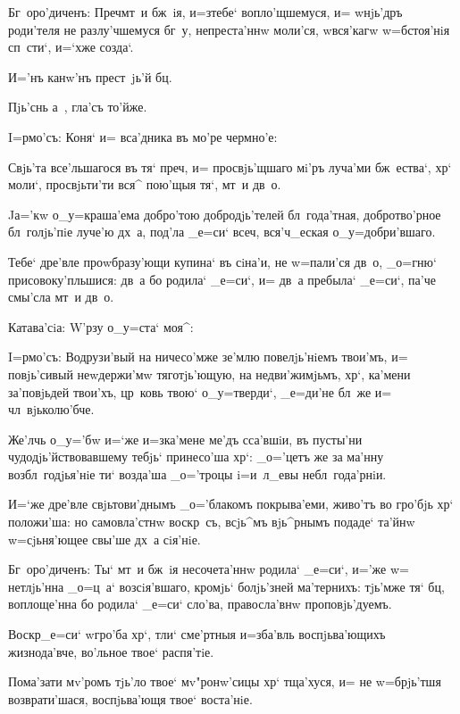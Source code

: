 Бг~оро'диченъ: Преч мт~и бж~iя, и=з\ъ тебе` 
вопло'щшемуся, и= w\т нjь'дръ роди'теля не разлу'чшемуся 
бг~у, непреста'ннw моли'ся, w\т вся'кагw w=бстоя'нiя 
сп~сти`, и=`хже созда`.

И='нъ канw'нъ прест~jь'й бц.

Пjь'снь а~, гла'съ то'йже.

I=рмо'съ: Коня` и= вса'дника въ мо'ре чермно'е:

Свjь'та все'льшагося въ тя` преч, и= 
просвjь'щшаго мi'ръ луча'ми бж~ества`, хр` моли`, 
просвjьти'ти вся^ пою'щыя тя`, мт~и дв~о.

Jа='кw о_у=краша'ема добро'тою добродjь'телей 
бл~года'тная, добротво'рное бл~голjь'пiе луче'ю дх~а, 
под'ла _е=си` всеч, вся'ч_еская о_у=добри'вшаго.

Тебе` дре'вле проwбразу'ющи купина` въ сiна'и, не 
w=пали'ся дв~о, _о=гню` присовоку'пльшися: дв~а бо 
родила` _е=си`, и= дв~а пребыла` _е=си`, па'че смы'сла 
мт~и дв~о.

Катава'сiа: W'рзу о_у=ста` моя^:


I=рмо'съ: Водрузи'вый на ничесо'мже зе'млю 
повелjь'нiемъ твои'мъ, и= повjь'сивый неwдержи'мw 
тяготjь'ющую, на недви'жимjьмъ, хр`, ка'мени 
за'повjьдей твои'хъ, цр~ковь твою` о_у=тверди`, _е=ди'не 
бл~же и= чл~вjьколю'бче.

Же'лчь о_у='бw и=`же и=з\ъ ка'мене ме'дъ сса'вшiи, въ 
пусты'ни чудодjь'йствовавшему тебjь` принесо'ша хр`: 
_о='цетъ же за ма'нну воз\ъ бл~годjья'нiе ти` возда'ша 
_о='троцы i=и~л_евы небл~года'рнiи.

И=`же дре'вле свjьтови'днымъ _о='блакомъ покрыва'еми, 
живо'тъ во гро'бjь хр` положи'ша: но самовла'стнw 
воскр~съ, всjь^мъ вjь^рнымъ подаде` та'йнw w=сjьня'ющее 
свы'ше дх~а сiя'нiе.

Бг~оро'диченъ: Ты` мт~и бж~iя несочета'ннw родила` 
_е=си`, и='же w= нетлjь'нна _о=ц~а` возсiя'вшаго, кромjь` 
болjь'зней ма'тернихъ: тjь'мже тя` бц, воплоще'нна бо 
родила` _е=си` сло'ва, правосла'внw проповjь'дуемъ. 


Воскр _е=си` w\т гро'ба хр`, тли` сме'ртныя 
и=зба'вль воспjьва'ющихъ жизнода'вче, во'льное твое` 
распя'тiе.

Пома'зати мv'ромъ тjь'ло твое` мv"ронw'сицы хр` 
тща'хуся, и= не w=брjь'тшя возврати'шася, воспjьва'ющя 
твое` воста'нiе.

